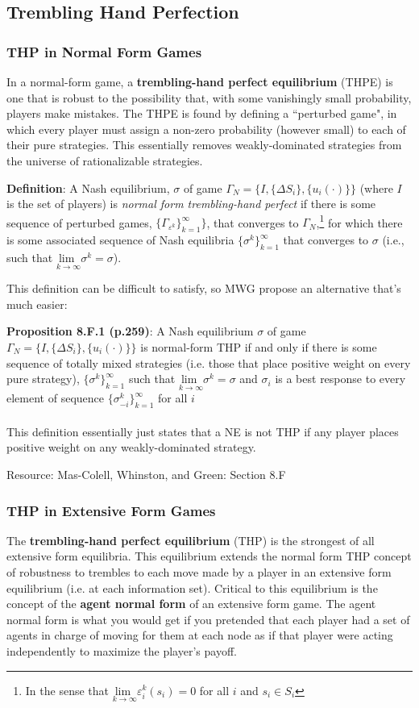 \documentclass{article}
\newcommand{\red}[1]{{\color{red}#1}}
\begin{document}
\subsection{Trembling Hand Perfection}
\subsubsection{THP in Normal Form Games}
In a normal-form game, a \textbf{trembling-hand perfect equilibrium} (THPE) is one that is robust to the possibility that, with some vanishingly small probability, players make mistakes. The THPE is found by defining a ``perturbed game", in which every player must assign a non-zero probability (however small) to each of their pure strategies. This essentially removes weakly-dominated strategies from the universe of rationalizable strategies. 


\textbf{Definition}: A Nash equilibrium, $\sigma$ of game ${\Gamma_N=\{I,\{\Delta S_i\},\{u_i(\cdot)\}\}}$ (where $I$ is the set of players) is \textit{normal form trembling-hand perfect} if there is some sequence of perturbed games, $\{\Gamma_{\varepsilon^k}\}_{k=1}^\infty\}$, that converges to $\Gamma_N$,\footnote{In the sense that ${\underset{k\rightarrow\infty}{\text{lim }}\varepsilon_i^k(s_i)=0}$ for all $i$ and ${s_i\in S_i}$} for which there is some associated sequence of Nash equilibria ${\{\sigma^k\}_{k=1}^\infty}$ that converges to $\sigma$ (i.e., such that ${\underset{k\rightarrow\infty}{\text{lim }}\sigma^k=\sigma}$).

This definition can be difficult to satisfy, so MWG propose an alternative that's much easier:


\textbf{Proposition 8.F.1 (p.259)}: A Nash equilibrium $\sigma$ of game ${\Gamma_N=\{I,\{\Delta S_i\},\{u_i(\cdot)\}\}}$ is normal-form THP if and only if there is some sequence of totally mixed strategies (i.e. those that place positive weight on every pure strategy), $\{\sigma^k\}_{k=1}^\infty$ such that ${\underset{k\rightarrow\infty}{\text{lim }}\sigma^k=\sigma}$ and $\sigma_i$ is a best response to every element of sequence $\{\sigma^k_{-i}\}_{k=1}^\infty$ for all $i$ \\
\\
This definition essentially just states that a NE is not THP if any player places positive weight on any weakly-dominated strategy.

\red{Resource: Mas-Colell, Whinston, and Green: Section 8.F}

\subsubsection{THP in Extensive Form Games}
The \textbf{trembling-hand perfect equilibrium} (THP) is the strongest of all extensive form equilibria. This equilibrium extends the normal form THP concept of robustness to trembles to each move made by a player in an extensive form equilibrium (i.e. at each information set). Critical to this equilibrium is the concept of the \textbf{agent normal form} of an extensive form game. The agent normal form is what you would get if you pretended that each player had a set of agents in charge of moving for them at each node as if that player were acting independently to maximize the player's payoff.
\end{document}
